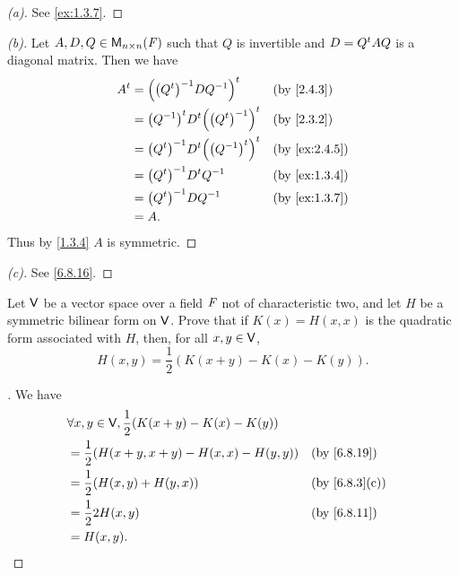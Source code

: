 \begin{proof}[(a)]
  See \cref{ex:1.3.7}.
\end{proof}

\begin{proof}[(b)]
  Let \(A, D, Q \in \ms[n][n][\F]\) such that \(Q\) is invertible and \(D = {Q}^{t} A Q\) is a diagonal matrix.
  Then we have
  \begin{align*}
    \tp{A} & = \tp{\pa{\pa{\tp{Q}}^{-1} D Q^{-1}}}                &  & \by{2.4.3}    \\
           & = \tp{\pa{Q^{-1}}} \tp{D} \tp{\pa{\pa{\tp{Q}}^{-1}}} &  & \by{2.3.2}    \\
           & = \pa{\tp{Q}}^{-1} \tp{D} \tp{\pa{\tp{\pa{Q^{-1}}}}} &  & \by{ex:2.4.5} \\
           & = \pa{\tp{Q}}^{-1} \tp{D} Q^{-1}                     &  & \by{ex:1.3.4} \\
           & = \pa{\tp{Q}}^{-1} D Q^{-1}                          &  & \by{ex:1.3.7} \\
           & = A.
  \end{align*}
  Thus by \cref{1.3.4} \(A\) is symmetric.
\end{proof}

\begin{proof}[(c)]
  See \cref{6.8.16}.
\end{proof}

\begin{ex}\label{ex:6.8.16}
  Let \(\mathsf{V}\) be a vector space over a field \(\mathit{F}\) not of characteristic two, and let \(H\) be a symmetric bilinear form on \(\mathsf{V}\).
  Prove that if \(K(x) = H(x, x)\) is the quadratic form associated with \(H\), then, for all \(x, y \in \mathsf{V}\),
  \[
    H(x, y) = \dfrac{1}{2} (K(x + y) - K(x) - K(y)).
  \]
\end{ex}

\begin{proof}[]
  We have
  \begin{align*}
     & \forall x, y \in \V, \dfrac{1}{2} (K(x + y) - K(x) - K(y))                    \\
     & = \dfrac{1}{2} (H(x + y, x + y) - H(x, x) - H(y, y))       &  & \by{6.8.19}   \\
     & = \dfrac{1}{2} (H(x, y) + H(y, x))                         &  & \by{6.8.3}[c] \\
     & = \dfrac{1}{2} 2 H(x, y)                                   &  & \by{6.8.11}   \\
     & = H(x, y).
  \end{align*}
\end{proof}

\begin{ex}\label{ex:6.8.21}
\end{ex}

\begin{ex}\label{ex:6.8.23}
\end{ex}
